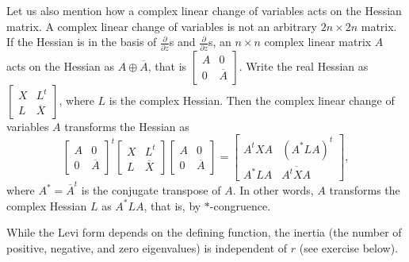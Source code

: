 \documentclass[12pt,openany]{book}
\theoremstyle{plain}
\theoremstyle{remark}
\theoremstyle{definition}
\theoremstyle{exercise}
\theoremstyle{example}
\begin{document}
Let us also mention how a complex linear change of variables
acts on the Hessian matrix.  A complex linear change of variables is not an
arbitrary $2n \times 2n$ matrix.  If the Hessian is in the 
basis of $\frac{\partial}{\partial z}$s and
$\frac{\partial}{\partial \bar{z}}$s, an $n \times n$ complex linear matrix $A$
acts on the Hessian as $A \oplus \overline{A}$, that is
$\left[ \begin{smallmatrix} A & 0 \\ 0 & \overline{A} \end{smallmatrix}
\right]$.
Write the real Hessian as
$\left[ \begin{smallmatrix} X & L^t \\ L & \overline{X} \end{smallmatrix}
\right]$, where $L$ is the complex Hessian.  Then the complex linear change
of variables $A$ transforms
the Hessian as
\begin{equation*}
{\begin{bmatrix} A & 0 \\ 0 & \overline{A} \end{bmatrix}}^t
\begin{bmatrix} X & L^t \\ L & \overline{X} \end{bmatrix}
\begin{bmatrix} A & 0 \\ 0 & \overline{A} \end{bmatrix}
=
\begin{bmatrix} A^tXA & {(A^*LA)}^t \\ A^*LA & \overline{A^tXA} \end{bmatrix} ,
\end{equation*}
where $A^* = \overline{A}^t$ is the conjugate
transpose of $A$.
In other words, $A$
transforms the complex Hessian $L$ as $A^* L A$, that is, by $*$-congruence.

While the Levi form depends on the defining function,
the inertia (the number of positive, negative, and zero
eigenvalues) is independent of $r$ (see exercise below).
\end{document}
